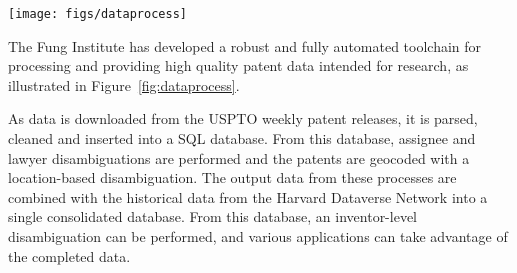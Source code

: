 \begin{figure*}
\center \texttt{[image: figs/dataprocess]}
\caption{Full patent data process flow}


\label{fig:dataprocess} 
\end{figure*}


The Fung Institute has developed a robust and fully automated toolchain
for processing and providing high quality patent data intended for
research, as illustrated in Figure~\ref{fig:dataprocess}.

As data is downloaded from the USPTO weekly patent releases, it is
parsed, cleaned and inserted into a SQL database. From this database,
assignee and lawyer disambiguations are performed and the patents
are geocoded with a location-based disambiguation. The output data
from these processes are combined with the historical data from the
Harvard Dataverse Network into a single consolidated database. From
this database, an inventor-level disambiguation can be performed,
and various applications can take advantage of the completed data.
